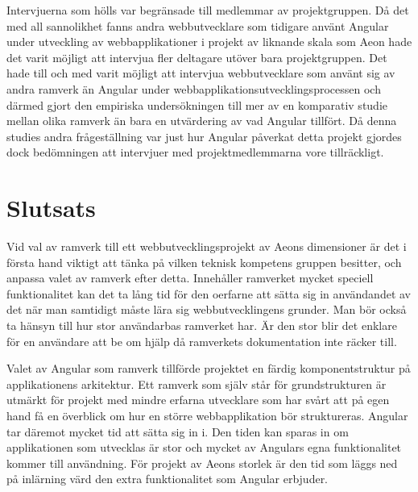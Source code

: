 Intervjuerna som hölls var begränsade till medlemmar av projektgruppen. Då det med all sannolikhet fanns andra webbutvecklare som tidigare använt Angular under utveckling av webbapplikationer i projekt av liknande skala som Aeon hade det varit möjligt att intervjua fler deltagare utöver bara projektgruppen. Det hade till och med varit möjligt att intervjua webbutvecklare som använt sig av andra ramverk än Angular under webbapplikationsutvecklingsprocessen och därmed gjort den empiriska undersökningen till mer av en komparativ studie mellan olika ramverk än bara en utvärdering av vad Angular tillfört. Då denna studies andra frågeställning var just hur Angular påverkat detta projekt gjordes dock bedömningen att intervjuer med projektmedlemmarna vore tillräckligt.

\section{Slutsats}

Vid val av ramverk till ett webbutvecklingsprojekt av Aeons dimensioner är det i första hand viktigt att tänka på vilken teknisk kompetens gruppen besitter, och anpassa valet av ramverk efter detta. Innehåller ramverket mycket speciell funktionalitet kan det ta lång tid för den oerfarne att sätta sig in användandet av det när man samtidigt måste lära sig webbutvecklingens grunder. Man bör också ta hänsyn till hur stor användarbas ramverket har. Är den stor blir det enklare för en användare att be om hjälp då ramverkets dokumentation inte räcker till.

Valet av Angular som ramverk tillförde projektet en färdig komponentstruktur på applikationens arkitektur. Ett ramverk som själv står för grundstrukturen är utmärkt för projekt med mindre erfarna utvecklare som har svårt att på egen hand få en överblick om hur en större webbapplikation bör struktureras. Angular tar däremot mycket tid att sätta sig in i. Den tiden kan sparas in om applikationen som utvecklas är stor och mycket av Angulars egna funktionalitet kommer till användning. För projekt av Aeons storlek är den tid som läggs ned på inlärning värd den extra funktionalitet som Angular erbjuder.

